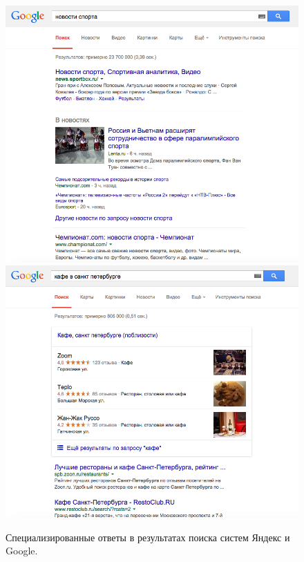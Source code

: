 \documentclass[12pt,a4paper]{report}
\begin{document}
\begin{figure}[b!]
  \includegraphics[height=0.27\textheight]{pics/VerticalResults-News-Google.png}
  \includegraphics[height=0.27\textheight]{pics/VerticalResults-Places-Google.png}
  \caption{Специализированные ответы в результатах поиска систем Яндекс и Google.}
  \label{vertical-results}
\end{figure}
\end{document}
